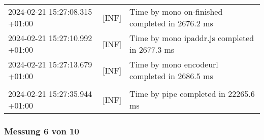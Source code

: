 {{\begin{tabularx}{\textwidth}{|l|l|X|}
                    2024-02-21 15:27:08.315 +01:00 & [INF] & Time by mono on-finished completed in 2676.2 ms \\
                    2024-02-21 15:27:10.992 +01:00 & [INF] & Time by mono ipaddr.js completed in 2677.3 ms \\
                    2024-02-21 15:27:13.679 +01:00 & [INF] & Time by mono encodeurl completed in 2686.5 ms \\
                    & & \\
                    2024-02-21 15:27:35.944 +01:00 & [INF] & Time by pipe completed in 22265.6 ms \\
                    \hline
                \end{tabularx}
            }
        }

    \subsubsection*{Messung 6 von 10} \label{subsubsec:LiteDbMehrPaketeAlsDb6von10}
